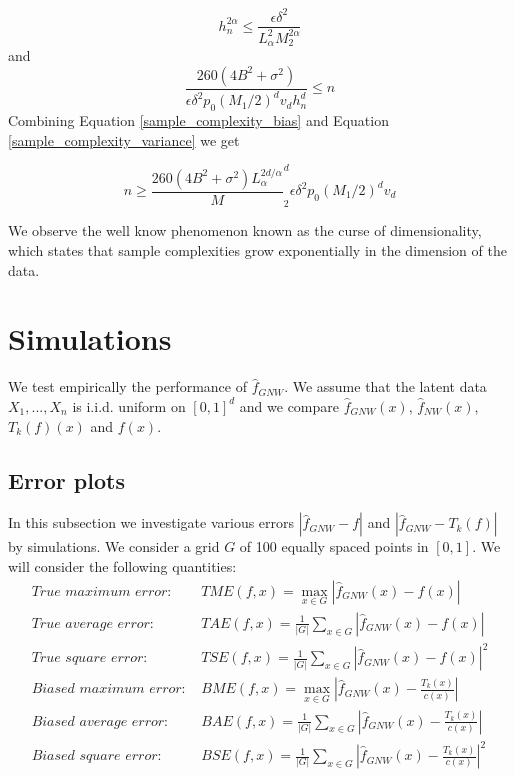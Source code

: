 \documentclass{article}
\begin{document}
\begin{equation}
\label{sample_complexity_bias}
    h_n^{2\alpha}\leq \frac{\epsilon\delta^2}{L_{\alpha}^2M_2^{2\alpha}}
\end{equation}
and
\begin{equation}
\label{sample_complexity_variance}
\frac{260(4B^2+\sigma^2)}{\epsilon\delta^2p_0(M_1/2)^dv_dh^d_n}\leq n
\end{equation}
Combining Equation \ref{sample_complexity_bias} and Equation \ref{sample_complexity_variance} we get

\begin{equation}
    n\geq \frac{260(4B^2+\sigma^2)L_{\alpha}^{2d/{\alpha}}}M_2^d{\epsilon\delta^2p_0(M_1/2)^dv_d}
\end{equation}

We observe the well know
phenomenon known as the curse of dimensionality, which states that sample complexities grow exponentially in the dimension of the data.



\section{Simulations}

We test empirically the performance of $\hat{f}_{GNW}$. We assume that the latent data $X_1,...,X_n$ is i.i.d. uniform on $[0,1]^d$ and we compare $\hat{f}_{GNW}(x)$, $\hat{f}_{NW}(x)$, $T_k(f)(x)$ and $f(x)$.
\subsection{Error plots}
In this subsection we investigate various errors
$|\hat{f}_{GNW}-f|$ and $|\hat{f}_{GNW}-T_k(f)|$ by simulations.
We consider a grid $G$ 
of 100 equally spaced points in $[0,1]$.
We will consider the following quantities:
\begin{equation*}
    \begin{split}
    \textit{True maximum error: }
    &
    TME(f,x)=\max_{x\in G}|\hat{f}_{GNW}(x)-f(x)|\\
    \textit{True average error: } &
    TAE(f,x)=\frac{1}{|G|}\sum_{x\in G}|\hat{f}_{GNW}(x)-f(x)|\\
    \textit{True square error: } &
    TSE(f,x)=\frac{1}{|G|}\sum_{x\in G}|\hat{f}_{GNW}(x)-f(x)|^2\\
    \textit{Biased maximum error: }
    &
    BME(f,x)=\max_{x\in G}|\hat{f}_{GNW}(x)-\frac{T_k(x)}{c(x)}|\\
    \textit{Biased average error: } 
    &
    BAE(f,x)=\frac{1}{|G|}\sum_{x\in G}|\hat{f}_{GNW}(x)-\frac{T_k(x)}{c(x)}|\\
    \textit{Biased square error: }
    &
    BSE(f,x)=\frac{1}{|G|}\sum_{x\in G}|\hat{f}_{GNW}(x)-\frac{T_k(x)}{c(x)}|^2
    \end{split}
\end{equation*}
\end{document}
